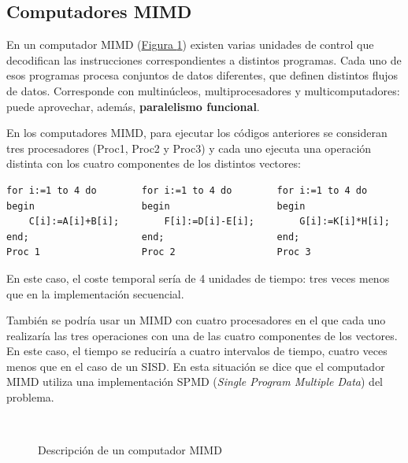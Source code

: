 \documentclass[10pt,a4paper,spanish]{report}
\begin{document}
\textcolor[rgb]{0.2,0.4,0.8}{\subsection{Computadores MIMD}}
En un computador MIMD (\hyperref[mimd]{Figura \ref*{mimd}}) existen varias unidades de control que decodifican las instrucciones correspondientes a distintos programas. Cada uno de esos programas procesa conjuntos de datos diferentes, que definen distintos flujos de datos. Corresponde con multinúcleos, multiprocesadores y multicomputadores: puede aprovechar, además, \textbf{\textcolor[rgb]{0.2,0.4,0.8}{paralelismo funcional}}.

En los computadores MIMD, para ejecutar los códigos anteriores se consideran tres procesadores (Proc1, Proc2 y Proc3) y cada uno ejecuta una operación distinta con los cuatro componentes de los distintos vectores:
\begin{verbatim}
for i:=1 to 4 do        for i:=1 to 4 do        for i:=1 to 4 do
begin                   begin                   begin
    C[i]:=A[i]+B[i];        F[i]:=D[i]-E[i];        G[i]:=K[i]*H[i];
end;                    end;                    end;
Proc 1                  Proc 2                  Proc 3
\end{verbatim}

En este caso, el coste temporal sería de 4 unidades de tiempo: tres veces menos que en la implementación secuencial. 

También se podría usar un MIMD con cuatro procesadores en el que cada uno realizaría las tres operaciones con una de las cuatro componentes de los vectores. En este caso, el tiempo se reduciría a cuatro intervalos de tiempo, cuatro veces menos que en el caso de un SISD. En esta situación se dice que el computador MIMD utiliza una implementación SPMD (\textit{\textcolor[rgb]{0.2,0.4,0.8}{Single Program Multiple Data}}) del problema.

\begin{figure}[!h]
\centering
\mbox {
\qquad
{}
}
\caption{Descripción de un computador MIMD}
\label{mimd}
\end{figure}
\end{document}

